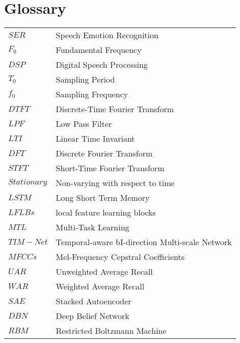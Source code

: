 
\chapter{Glossary} %

    
	\begin{longtable}{ll}
    
	
    $SER$ & {Speech Emotion Recognition} \\
    
    
    $F_0$ & {Fundamental Frequency} \\

    $DSP$ & {Digital Speech Processing} \\
    $T_0$ & {Sampling Period} \\
    $f_0$ & {Sampling Frequency} \\
    $DTFT$ & {Discrete-Time Fourier Transform} \\
    $LPF$ & {Low Pass Filter} \\
    $LTI$ & {Linear Time Invariant} \\
    $DFT$ & {Discrete Fourier Transform} \\
    $STFT$ & {Short-Time Fourier Transform} \\
    $Stationary$ & {Non-varying with respect to time} \\
    
    $LSTM$ & {Long Short Term Memory} \\
    $LFLBs$ & {local feature learning blocks} \\
    $ MTL$ & {Multi-Task Learning} \\
    $TIM-Net$ & {Temporal-aware bI-direction Multi-scale Network} \\
    $MFCCs$ & {Mel-Frequency Cepstral Coefficients}  \\
    $UAR$ & {Unweighted Average Recall} \\
    $WAR$ & {Weighted Average Recall} \\
    $SAE$ & {Stacked Autoencoder} \\
    $DBN$ & {Deep Belief Network} \\
    $RBM$ & {Restricted Boltzmann Machine} \\
    

\end{longtable}

